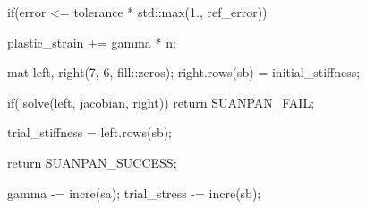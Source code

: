 \begin{cppcode}
{{        if(error <= tolerance * std::max(1., ref_error)) {
            plastic_strain += gamma * n;

            mat left, right(7, 6, fill::zeros);
            right.rows(sb) = initial_stiffness;

            if(!solve(left, jacobian, right)) return SUANPAN_FAIL;

            trial_stiffness = left.rows(sb);

            return SUANPAN_SUCCESS;
        }

        gamma -= incre(sa);
        trial_stress -= incre(sb);
    }
}
\end{cppcode}